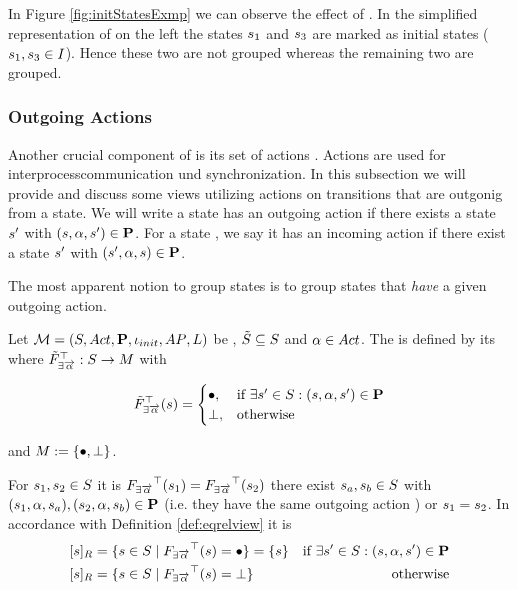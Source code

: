 \documentclass[preview]{standalone}
\begin{document}
In Figure \ref{fig:initStatesExmp} we can observe the effect of \viewinitstates. In the simplified representation of \achgphN on the left the states ${s}_1$ and ${s}_3$ are marked as initial states (${s}_1, {s}_3 \in {I}$). Hence these two are not grouped whereas the remaining two are grouped.


\subsubsection{Outgoing Actions}
Another crucial component of \achgphN is its set of actions \actions. Actions are used for interprocesscommunication und synchronization. In this subsection we will provide and discuss some views utilizing actions on transitions that are outgonig from a state. 
We will write a state \state has an outgoing action \action if there exists a state ${s}'$ with $({s}, {\alpha}, {s}') \in {\ensuremath{{\textbf{P}}}}$. For a state \state, we say it has an incoming action \action if there exist a state ${s}'$ with $({s}', {\alpha}, {s}) \in {\ensuremath{{\textbf{P}}}}$.

The most apparent notion to group states is to group states that \emph{have} a given outgoing action.

\begin{definition}
	Let ${{{\mathcal{M}}}} = {{({S}, {Act}, {\textbf{P}}, {\iota_{init}}, {AP}, {L})}}$ be \achgphN, ${\tilde{{S}}} \subseteq {S}$ and ${\alpha} \in {Act}$. The \viewN \viewhasoutaction is defined by its \grpfctN \gfcthasoutaction where ${{\tilde{F}_{{\exists{\overrightarrow{\ensuremath{{\alpha}}}}}}}^{\top}} : {S} \to {\ensuremath{{M}}}$ with

	\[
	{{\tilde{F}_{{\exists{\overrightarrow{\ensuremath{{\alpha}}}}}}}^{\top}}({s}) =
	\begin{cases}
			{\bullet},				& \text{if } \exists {s}' \in {S}: ({s}, {\alpha}, {s}') \in {\ensuremath{{\textbf{P}}}} \\
			{\bot},          	& \text{otherwise}
		\end{cases}
	\]
	
	and ${{M}} := {\{{\bullet}, {\bot}\}}$. %
\end{definition}


For ${s}_1,{s}_2 \in {S}$ it is ${{F_{{\exists{\overrightarrow{\ensuremath{{\alpha}}}}}}}^{\top}}({s}_1) = {{F_{{\exists{\overrightarrow{\ensuremath{{\alpha}}}}}}}^{\top}}({s}_2)$ \iffN 
there exist ${s}_{a},{s}_{b} \in {S}$ with 
$({s}_1, {\alpha}, {s}_{a}), ({s}_2, {\alpha}, {s}_{b}) \in {\ensuremath{{\textbf{P}}}}$ (i.e. they have the same outgoing action \action) or ${s}_1 = {s}_2$. 
In accordance with Definition \ref{def:eqrelview} it is
\begin{align*}
	\eqclassv &= \{\state \in \states \mid \gfcthasoutaction(\state) = \remelem\} = \{s\} &\text{if }\exists\state' \in \states : (\state, \action, \state') \in \trans \\
	\eqclassv &= \{\state \in \states \mid \gfcthasoutaction(\state) = \notppty\}  &\text{ otherwise}
\end{align*}
\end{document}

